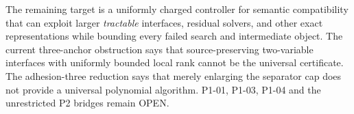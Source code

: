 \documentclass[11pt]{article}
\begin{document}
The remaining target is a uniformly charged controller for semantic
compatibility that can exploit larger \emph{tractable} interfaces, residual
solvers, and other exact representations while bounding every failed search
and intermediate object. The current three-anchor obstruction says that
source-preserving two-variable interfaces with uniformly bounded local rank
cannot be the universal certificate. The adhesion-three reduction says that
merely enlarging the separator cap does not provide a universal polynomial
algorithm. P1-01, P1-03, P1-04 and the unrestricted P2 bridges remain OPEN.



\end{document}
